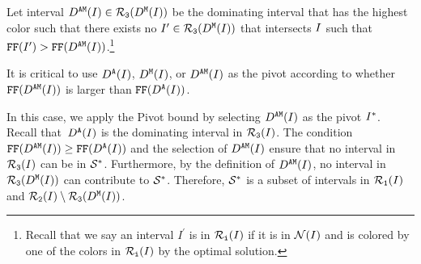 \smallskip

\begin{definition}
    \shortversion{\label{def:z_bar_short}}
    \fullversion{\label{def:z_bar}}
    Let interval $D^\texttt{AM}(I) \in \mathcal{R}_\texttt{3}(D^\texttt{M}(I))$ be the dominating interval that has the highest color such that there exists no $I^\prime \in \mathcal{R}_\texttt{3}(D^\texttt{M}(I))$ that intersects $I$ such that $\text{\texttt{FF}}(I^\prime) > \text{\texttt{FF}}(D^\texttt{AM}(I))$.\footnote{Recall that we say an interval $I^\prime$ is in $\mathcal{R}_\texttt{i}(I)$ if it is in $\mathcal{N}(I)$ and is colored by one of the colors in $\mathcal{R}_\texttt{i}(I)$ by the optimal solution.}
\end{definition}

It is critical to use $D^\texttt{A}(I)$, $D^\texttt{M}(I)$, or $D^\texttt{AM}(I)$ as the pivot according to whether $\text{\texttt{FF}}(D^\texttt{AM}(I))$ is larger than $\text{\texttt{FF}}(D^\texttt{A}(I))$.


In this case, we apply the Pivot bound by selecting $D^\texttt{AM}(I)$ as the pivot $I^*$.
Recall that~$D^\texttt{A}(I)$ is the dominating interval in $\mathcal{R}_\texttt{3}(I)$.
The condition $\text{\texttt{FF}}(D^\texttt{AM}(I)) \geq \text{\texttt{FF}}(D^\texttt{A}(I))$ and the selection of $D^\texttt{AM}(I)$ ensure that no interval in $\mathcal{R}_\texttt{3}(I)$ can be in $\mathcal{S}^*$.
Furthermore, by the definition of $D^\texttt{AM}(I)$, no interval in $\mathcal{R}_\texttt{3}(D^\texttt{M}(I))$ can contribute to $\mathcal{S}^*$.
Therefore, $\mathcal{S}^*$ is a subset of intervals in $\mathcal{R}_\texttt{1}(I)$ and $\mathcal{R}_\texttt{2}(I)\setminus \mathcal{R}_\texttt{3}(D^\texttt{M}(I))$.


